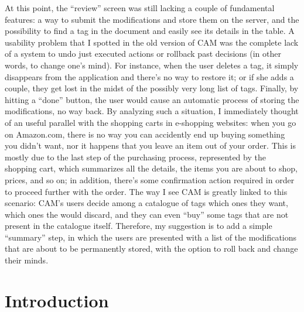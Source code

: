 \documentclass[12pt,oneside,svgnames]{memoir}
\begin{document}
At this point, the ``review'' screen was still lacking a couple of
fundamental features: a way to submit the modifications and store them
on the server, and the possibility to find a tag in the document and
easily see its details in the table. A usability problem that I spotted
in the old version of CAM was the complete lack of a system to undo just
executed actions or rollback past decisions (in other words, to change
one's mind). For instance, when the user deletes a tag, it simply
disappears from the application and there's no way to restore it; or if
she adds a couple, they get lost in the midst of the possibly very long
list of tags. Finally, by hitting a ``done'' button, the user would
cause an automatic process of storing the modifications, no way back. By
analyzing such a situation, I immediately thought of an useful parallel
with the shopping carts in e-shopping websites: when you go on
Amazon.com, there is no way you can accidently end up buying something
you didn't want, nor it happens that you leave an item out of your
order. This is mostly due to the last step of the purchasing process,
represented by the shopping cart, which summarizes all the details, the
items you are about to shop, prices, and so on; in addition, there's
some confirmation action required in order to proceed further with the
order. The way I see CAM is greatly linked to this scenario: CAM's users
decide among a catalogue of tags which ones they want, which ones the
would discard, and they can even ``buy'' some tags that are not present
in the catalogue itself. Therefore, my suggestion is to add a simple
``summary'' step, in which the users are presented with a list of the
modifications that are about to be permanently stored, with the option
to roll back and change their minds.

\chapter*{Introduction}\label{introduction}
\end{document}

